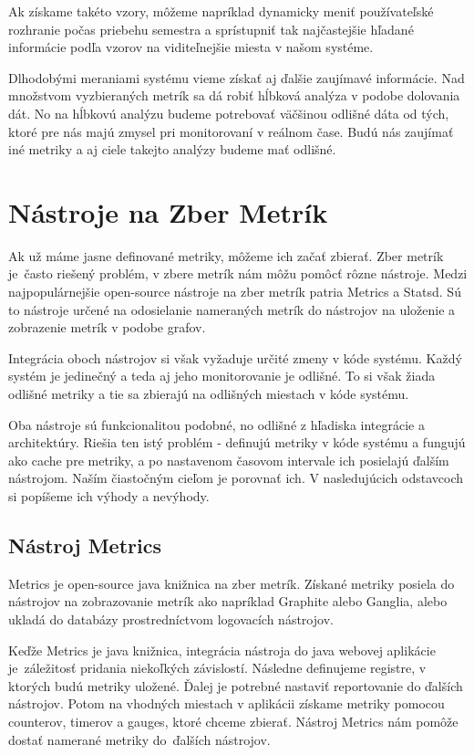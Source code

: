 \documentclass[a4paper, usesections, upjsfrontpage, thesismargins, thesislinespacing, twoside]{rnthesissvk}
\begin{document}
Ak získame takéto vzory, môžeme napríklad dynamicky meniť používateľské rozhranie počas priebehu semestra a sprístupniť tak najčastejšie hľadané informácie podľa vzorov na viditeľnejšie miesta v našom systéme.

Dlhodobými meraniami systému vieme získať aj ďalšie zaujímavé informácie.
Nad množstvom vyzbieraných metrík sa dá robiť hĺbková analýza v podobe dolovania dát.
No na hĺbkovú analýzu budeme potrebovať väčšinou odlišné dáta od tých, ktoré pre nás majú zmysel pri monitorovaní v reálnom čase.
Budú nás zaujímať iné metriky a aj ciele takejto analýzy budeme mať odlišné.

\newpage

\section{Nástroje na Zber Metrík}

Ak už máme jasne definované metriky, môžeme ich začať zbierať.
Zber metrík je~často riešený problém, v zbere metrík nám môžu pomôcť rôzne nástroje.
Medzi naj\-populár\-nejšie open-source nástroje na zber metrík patria Metrics a Statsd.
Sú to nástroje určené na odosielanie nameraných metrík do nástrojov na uloženie a zobrazenie metrík v podobe grafov.

Integrácia oboch nástrojov si však vyžaduje určité zmeny v kóde systému.
Každý systém je jedinečný a teda aj jeho monitorovanie je odlišné.
To si však žiada odlišné metriky a tie sa zbierajú na odlišných miestach v kóde systému.

Oba nástroje sú funkcionalitou podobné, no odlišné z hľadiska integrácie a architektúry.
Riešia ten istý problém - definujú metriky v kóde systému a fungujú ako cache pre metriky, a po nastavenom časovom intervale ich posielajú ďalším nástrojom.
Naším čiastočným cieľom je porovnať ich.
V nasledujúcich odstavcoch si popíšeme ich výhody a nevýhody.

\subsection{Nástroj Metrics}

Metrics je open-source java knižnica na zber metrík.
Získané metriky posiela do nástrojov na zobrazovanie metrík ako napríklad Graphite alebo Ganglia, alebo ukladá do databázy prostredníctvom logovacích nástrojov.

Keďže Metrics je java knižnica, integrácia nástroja do java webovej aplikácie je~záležitosť pridania niekoľkých závislostí.
Následne definujeme registre, v ktorých budú metriky uložené.
Ďalej je potrebné nastaviť reportovanie do ďalších nástrojov.
Potom na vhodných miestach v aplikácii získame metriky pomocou counterov, timerov a gauges, ktoré chceme zbierať.
Nástroj Metrics nám pomôže dostať namerané metriky do~ďalších nástrojov.
\end{document}
